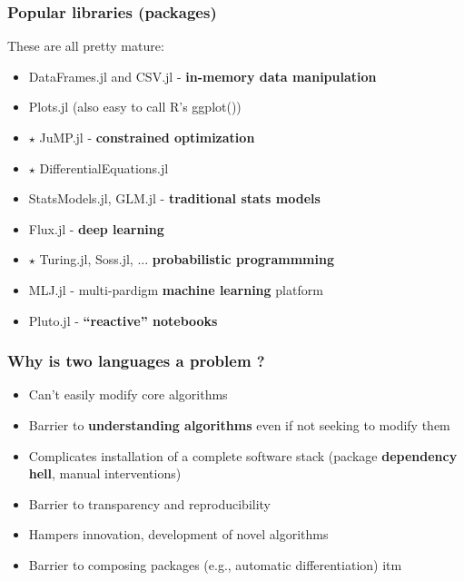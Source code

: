 \documentclass[t]{beamer}
\newcommand\df{\bf\color{Maroon}}
\begin{document}
  


\begin{frame}
  \frametitle{Popular libraries (packages)}
  These are all pretty mature:
  \begin{itemize}
  \item DataFrames.jl and CSV.jl  - {\df in-memory data manipulation}
  \item Plots.jl (also easy to call R's ggplot())
  \item $\star$ JuMP.jl - {\df constrained optimization}
  \item $\star$ DifferentialEquations.jl
  \item StatsModels.jl, GLM.jl - {\df traditional stats models}
  \item Flux.jl  - {\df deep learning}
  \item $\star$ Turing.jl, Soss.jl, ... {\df probabilistic programmming}
  \item MLJ.jl - multi-pardigm {\df machine learning} platform
  \item Pluto.jl - {\df ``reactive'' notebooks}
  \end{itemize}
\end{frame}


  
\begin{frame}
  \frametitle{Why  is two languages a problem ?}
  \begin{itemize}
    \item Can't easily modify core algorithms
    \item Barrier to {\df understanding algorithms} even if not seeking to modify them
    \item Complicates installation of a complete software stack
    (package {\df dependency hell}, manual interventions)
    \item Barrier to transparency and reproducibility
    \item Hampers innovation, development of novel algorithms
    \item Barrier to composing packages (e.g., automatic differentiation)
  itm
  \end{itemize}
\end{frame}
\end{document}
